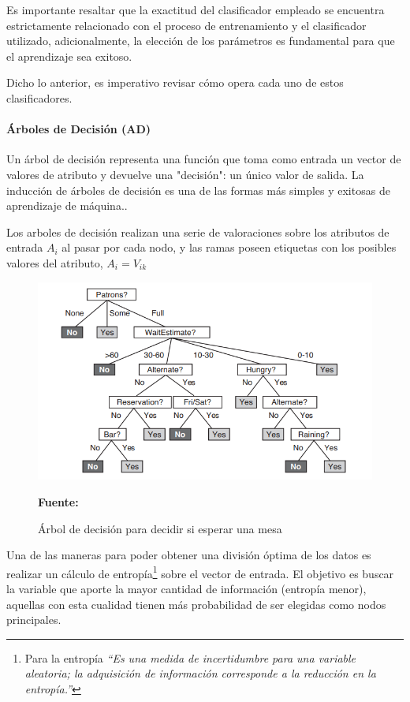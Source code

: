 Es importante resaltar que la exactitud del clasificador empleado se encuentra estrictamente relacionado con el proceso de entrenamiento y el clasificador utilizado, adicionalmente, la elección de los parámetros es fundamental para que el aprendizaje sea exitoso. \parencite[7]{Flach2012MachineLearning}

Dicho lo anterior, es imperativo revisar cómo opera cada uno de estos clasificadores.
\paragraph{Árboles de Decisión (AD)}
Un árbol de decisión representa una función que toma como entrada un vector de valores de atributo y devuelve una "decisión": un único valor de salida. La inducción de árboles de decisión es una de las formas más simples y exitosas de aprendizaje de máquina.\parencite[697]{Russel2010Artificial_Intelligence_3rd}.

Los arboles de decisión realizan una serie de valoraciones sobre los atributos de entrada $A_i$ al pasar por cada nodo, y las ramas poseen etiquetas con los posibles valores del atributo, $A_i = V_{ik}$

\begin{figure}[H]
    \centering
    \includegraphics[width=1\textwidth]{Anexos/LATEX/chapters/images/add.PNG}
    \caption{Árbol de decisión para decidir si esperar una mesa}
    \small{\textbf{Fuente:} \parencite[699]{Russel2010Artificial_Intelligence_3rd}}
    \label{add}
\end{figure}

Una de las maneras para poder obtener una división óptima de los datos es realizar un cálculo de entropía\footnote{Para \parencite[703]{Russel2010Artificial_Intelligence_3rd} la entropía \textit{“Es una medida de incertidumbre para una variable
aleatoria; la adquisición de información corresponde a la reducción en la entropía.”}} sobre el vector de entrada. El objetivo es buscar la variable que aporte la mayor cantidad de información (entropía menor), aquellas con esta cualidad tienen más probabilidad de ser elegidas como nodos principales.

